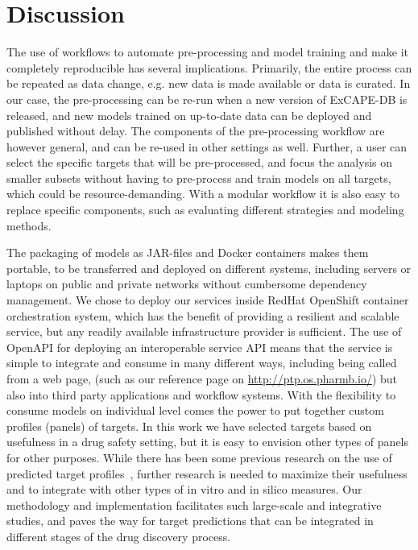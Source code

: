 \documentclass[utf8]{frontiersSCNS} %
\begin{document}
\section*{Discussion}
The use of workflows to automate pre-processing and model training and make it
completely reproducible has several implications. Primarily, the entire process
can be repeated as data change, e.g. new data is made available or data is
curated. In our case, the pre-processing can be re-run when a new version of
ExCAPE-DB is released, and new models trained on up-to-date data can be
deployed and published without delay. The components of the pre-processing
workflow are however general, and can be re-used in other settings as well.
Further, a user can select the specific targets that will be pre-processed, and
focus the analysis on smaller subsets without having to pre-process and train
models on all targets, which could be resource-demanding. With a modular
workflow it is also easy to replace specific components, such as evaluating
different strategies and modeling methods.

The packaging of models as JAR-files and Docker containers makes them portable, to be
transferred and deployed on different systems, including servers or laptops on
public and private networks without cumbersome dependency management. We chose
to deploy our services inside RedHat OpenShift container orchestration system,
which has the benefit of providing a resilient and scalable service, but any
readily available infrastructure provider is sufficient. The use of OpenAPI for
deploying an interoperable service API means that the service is simple to
integrate and consume in many different ways, including being called from a web
page, (such as our reference page on \url{http://ptp.os.pharmb.io/})
but also into third party applications and workflow systems. With the
flexibility to consume models on individual level comes the power to put
together custom profiles (panels) of targets. In this work we have selected
targets based on usefulness in a drug safety setting, but it is easy to
envision other types of panels for other purposes. While there has been some
previous research on the use of predicted target
profiles~\cite{Awale:2017is,Yao:2016ij}, further research is needed to maximize
their usefulness and to integrate with other types of in vitro and in silico
measures. Our methodology and implementation facilitates such large-scale and
integrative studies, and paves the way for target predictions that can be
integrated in different stages of the drug discovery process.
\end{document}

